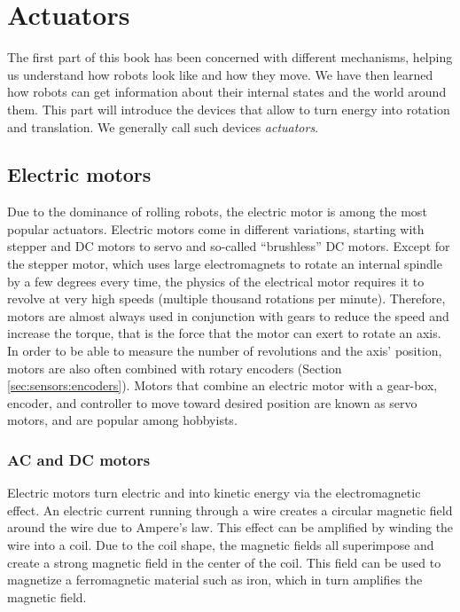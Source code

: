 \chapter{Actuators}
The first part of this book has been concerned with different mechanisms, helping us understand how robots look like and how they move. We have then learned how robots can get information about their internal states and the world around them. This part will introduce the devices that allow to turn energy into rotation and translation. We generally call such devices \emph{actuators}.

\section{Electric motors}
Due to the dominance of rolling robots, the electric motor is among the most popular actuators. Electric motors come in different variations, starting with stepper and DC motors to servo and so-called ``brushless'' DC motors. Except for the stepper motor, which uses large electromagnets to rotate an internal spindle by a few degrees every time, the physics of the electrical motor requires it to revolve at very high speeds (multiple thousand rotations per minute). Therefore, motors are almost always used in conjunction with gears to reduce the speed and increase the torque, that is the force that the motor can exert to rotate an axis. In order to be able to measure the number of revolutions and the axis' position, motors are also often combined with rotary encoders (Section \ref{sec:sensors:encoders}). Motors that combine an electric motor with a gear-box, encoder, and controller to move toward desired position are known as servo motors, and are popular among hobbyists.

\subsection{AC and DC motors}
Electric motors turn electric and into kinetic energy via the electromagnetic effect. An electric current running through a wire creates a circular magnetic field around the wire due to Ampere's law. This effect can be amplified by winding the wire into a coil. Due to the coil shape, the magnetic fields all superimpose and create a strong magnetic field in the center of the coil. This field can be used to magnetize a ferromagnetic material such as iron, which in turn amplifies the magnetic field. 

